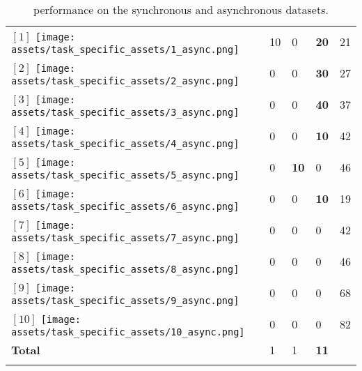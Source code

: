 \begin{table}[h]
\begin{tabular}{llll|l}
        \midrule
        $\hyperref[fig:0_async]{[1 ]}$ \texttt{[image: assets/task\_specific\_assets/1\_async.png]} & 10 & 0 & \textbf{20} & 21       \\
        $\hyperref[fig:1_async]{[2 ]}$ \texttt{[image: assets/task\_specific\_assets/2\_async.png]} & 0 & 0 & \textbf{30} & 27      \\
        $\hyperref[fig:2_async]{[3 ]}$ \texttt{[image: assets/task\_specific\_assets/3\_async.png]} & 0 & 0 & \textbf{40} & 37      \\
        $\hyperref[fig:3_async]{[4 ]}$ \texttt{[image: assets/task\_specific\_assets/4\_async.png]} & 0 & 0 & \textbf{10} & 42      \\
        $\hyperref[fig:4_async]{[5 ]}$ \texttt{[image: assets/task\_specific\_assets/5\_async.png]} & 0 & \textbf{10} & 0 & 46 \\
        $\hyperref[fig:5_async]{[6 ]}$ \texttt{[image: assets/task\_specific\_assets/6\_async.png]} & 0 & 0 & \textbf{10} & 19      \\
        $\hyperref[fig:6_async]{[7 ]}$ \texttt{[image: assets/task\_specific\_assets/7\_async.png]} & 0 & 0 & 0 & 42      \\
        $\hyperref[fig:7_async]{[8 ]}$ \texttt{[image: assets/task\_specific\_assets/8\_async.png]} & 0 & 0 & 0 & 46      \\
        $\hyperref[fig:8_async]{[9 ]}$ \texttt{[image: assets/task\_specific\_assets/9\_async.png]} & 0 & 0 & 0 & 68      \\
        $\hyperref[fig:9_async]{[10]}$ \texttt{[image: assets/task\_specific\_assets/10\_async.png]} & 0 & 0 & 0 & 82      \\
        \midrule
        \textbf{Total}   & 1 & 1 & \textbf{11} & \\
        \addlinespace[0.5em]
        \bottomrule
    \end{tabular}
    \caption{\gptfo{} performance on the synchronous and asynchronous datasets.}
    \label{tab:tasks-results}
\end{table}